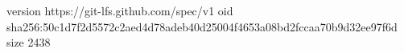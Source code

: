 version https://git-lfs.github.com/spec/v1
oid sha256:50c1d7f2d5572c2aed4d78adeb40d25004f4653a08bd2fccaa70b9d32ee97f6d
size 2438
